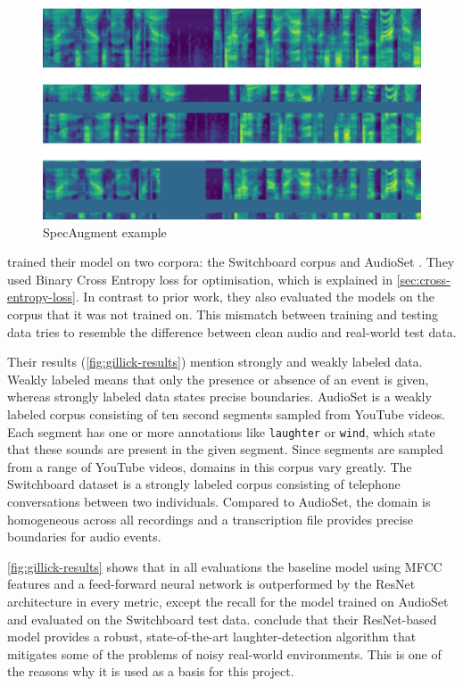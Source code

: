 \documentclass[bsc,frontabs,parskip,deptreport]{infthesis}
\begin{document}
\begin{figure}[h!]
    \centering
    \includegraphics[width=13cm]{imgs/examples/spec_augment_example.png}
    \caption{SpecAugment example}
    \label{fig:spec-augment}
\end{figure}

\citet{gillick2021robust} trained their model on two corpora: the Switchboard corpus \citep{switchboard-corpus} and AudioSet \citep{googleaudioset}. They used Binary Cross Entropy loss for optimisation, which is explained in \autoref{sec:cross-entropy-loss}.
In contrast to prior work, they also evaluated the models on the corpus that it was not trained on.
This mismatch between training and testing data tries to resemble the difference between clean audio and real-world test data.

Their results (\autoref{fig:gillick-results}) mention strongly and weakly labeled data.
Weakly labeled means that only the presence or absence of an event is given, whereas strongly labeled data states precise boundaries.
AudioSet \citep{googleaudioset} is a weakly labeled corpus consisting of ten second segments sampled from YouTube videos. Each segment has one or more annotations like \texttt{laughter} or \texttt{wind}, which state that these sounds are present in the given segment. Since segments are sampled from a range of YouTube videos, domains in this corpus vary greatly.
The Switchboard dataset is a strongly labeled corpus consisting of telephone conversations between two individuals. Compared to AudioSet, the domain is homogeneous across all recordings and a transcription file provides precise boundaries for audio events.

\autoref{fig:gillick-results} shows that in all evaluations the baseline model using MFCC features and a feed-forward neural network is outperformed by the ResNet architecture in every metric, except the recall for the model trained on AudioSet and evaluated on the Switchboard test data. 
\citet{gillick2021robust} conclude that their ResNet-based model provides a robust, state-of-the-art laughter-detection algorithm that mitigates some of the problems of noisy real-world environments. This is one of the reasons why it is used as a basis for this project.
\end{document}
